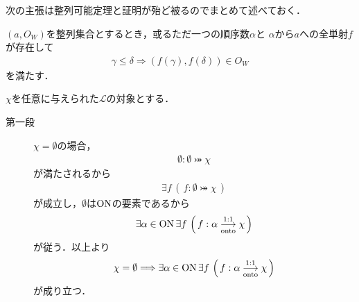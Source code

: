 	次の主張は整列可能定理と証明が殆ど被るのでまとめて述べておく．
	\begin{screen}
		\begin{thm}[整列集合は唯一つの順序数に順序同型である]\label{thm:existence_of_order_type}
			$(a,O_W)$を整列集合とするとき，或るただ一つの順序数$\alpha$と
			$\alpha$から$a$への全単射$f$が存在して
			\begin{align}
				\gamma \leq \delta \Longrightarrow (f(\gamma),f(\delta)) \in O_W
			\end{align}
			を満たす．
		\end{thm}
	\end{screen}
	
	\begin{prf} $\chi$を任意に与えられた$\mathcal{L}$の対象とする．
		\begin{description}
			\item[第一段]
				$\chi = \emptyset$の場合，
				\begin{align}
					\emptyset: \emptyset \bij \chi
				\end{align}
				が満たされるから
				\begin{align}
					\exists f\, \left(\, f:\emptyset \bij \chi\, \right)
				\end{align}
				が成立し，$\emptyset$は$\mathrm{ON}$の要素であるから
				\begin{align}
					\exists \alpha \in \mathrm{ON}\, \exists f\, \left(\, f:\alpha \underset{\mathrm{onto}}{\overset{\mathrm{1:1}}{\longrightarrow}} \chi\, \right)
				\end{align}
				が従う．以上より
				\begin{align}
					\chi = \emptyset \Longrightarrow \exists \alpha \in \mathrm{ON}\, 
					\exists f\, \left(\, f:\alpha \underset{\mathrm{onto}}{\overset{\mathrm{1:1}}{\longrightarrow}} \chi\, \right)
				\end{align}
				が成り立つ．
				

\end{description}
\end{prf}
